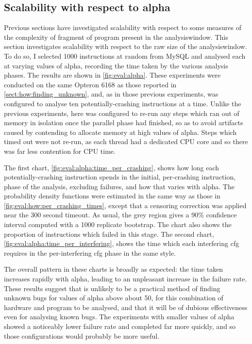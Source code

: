 \subsection{Scalability with respect to \gls{alpha}}




\noindent
Previous sections have investigated scalability with respect to some
measures of the complexity of fragment of program present in the
\gls{analysiswindow}.  This section investigates scalability with
respect to the raw size of the \gls{analysiswindow}.  To do so, I
selected 1000 instructions at random from MySQL and analysed each at
varying values of \gls{alpha}, recording the time taken by the various
analysis phases.  The results are shown in \autoref{fig:eval:alpha}.
These experiments were conducted on the same Opteron 6168 as those
reported in \autoref{sect:how:finding_unknown}, and, as in those
previous experiments, {\technique} was configured to analyse ten
potentially-crashing instructions at a time.  Unlike the previous
experiments, here {\technique} was configured to re-run any steps
which ran out of memory in isolation once the parallel phase had
finished, so as to avoid artifacts caused by contending to allocate
memory at high values of \gls{alpha}.  Steps which timed out were not
re-run, as each thread had a dedicated CPU core and so there was far
less contention for CPU time.

The first chart, \autoref{fig:eval:alpha:time_per_crashing}, shows how
long each potentially-crashing instruction spends in the initial,
per-crashing instruction, phase of the analysis, excluding failures,
and how that varies with \gls{alpha}.  The probability density
functions were estimated in the same way as those in
\autoref{fig:eval:how:per_crashing_times}, except that a censoring
correction was applied near the 300 second timeout.  As usual, the
grey region gives a 90\% confidence interval computed with a 1000
replicate bootstrap.  The chart also shows the proportion of
instructions which failed in this stage.  The second chart,
\autoref{fig:eval:alpha:time_per_interfering}, shows the time which
each interfering \gls{cfg} requires in the per-interfering \gls{cfg}
phase in the same style.

The overall pattern in these charts is broadly as expected: the time
taken increases rapidly with \gls{alpha}, leading to an unpleasant
increase in the failure rate.  These results suggest that {\technique}
is unlikely to be a practical method of finding unknown bugs for
values of \gls{alpha} above about 50, for this combination of hardware
and program to be analysed, and that it will be of dubious
effectiveness even for analysing known bugs.  The experiments with
smaller values of \gls{alpha} showed a noticeably lower failure rate
and completed far more quickly, and so those configurations would
probably be more useful.


